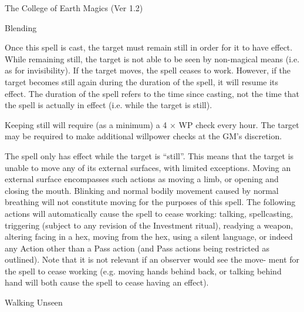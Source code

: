 \begin{Chapter}{The College of Earth Magics (Ver 1.2)}
\begin{spell}[G-4]{Blending }
\begin{effects}
Once this spell is cast, the target must remain still in order for it
to have effect.  While remaining still, the target is not able to be
seen by non-magical means (i.e.  as for invisibility).  If the target
moves, the spell ceases to work. However, if the target becomes still
again during the duration of the spell, it will resume its effect.
The duration of the spell refers to the time since casting, not the
time that the spell is actually in effect (i.e.  while the target is
still).

Keeping still will require (as a minimum) a 4 × WP check every hour.
The target may be required to make additional willpower checks at the
GM’s discretion.

The spell only has effect while the target is “still”.  This means
that the target is unable to move any of its external surfaces, with
limited exceptions. Moving an external surface encompasses such
actions as moving a limb, or opening and closing the mouth.  Blinking
and normal bodily movement caused by normal breathing will not
constitute moving for the purposes of this spell.  The following
actions will automatically cause the spell to cease working: talking,
spellcasting, triggering (subject to any revision of the Investment
ritual), readying a weapon, altering facing in a hex, moving from the
hex, using a silent language, or indeed any Action other than a Pass
action (and Pass actions being restricted as outlined).  Note that it
is not relevant if an observer would see the move- ment for the spell
to cease working (e.g.  moving hands behind back, or talking behind
hand will both cause the spell to cease having an effect).
\end{effects}
\end{spell}

\begin{spell}[G-5]{Walking Unseen }


\end{spell}
\end{Chapter}
